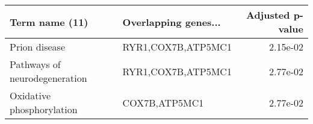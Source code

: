 \begin{tabular}{llr}
\toprule
               Term name (11) & Overlapping genes... &  Adjusted p-value \\
\midrule
                Prion disease &   RYR1,COX7B,ATP5MC1 &          2.15e-02 \\
Pathways of neurodegeneration &   RYR1,COX7B,ATP5MC1 &          2.77e-02 \\
    Oxidative phosphorylation &        COX7B,ATP5MC1 &          2.77e-02 \\
\bottomrule
\end{tabular}
